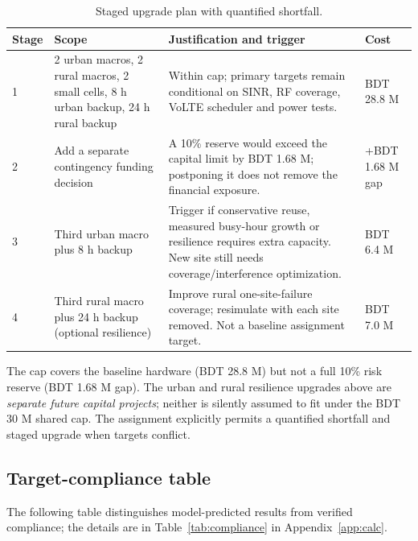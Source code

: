 \documentclass[9pt,a4paper]{extarticle}
\begin{document}
\begin{table}[H]\centering\small
\caption{Staged upgrade plan with quantified shortfall.}
\label{tab:stages}
\begin{tabularx}{\textwidth}{@{}p{0.75cm}p{4.7cm}Xp{1.85cm}@{}}
\toprule
\textbf{Stage} & \textbf{Scope} & \textbf{Justification and trigger} & \textbf{Cost} \\
\midrule
1 & 2 urban macros, 2 rural macros, 2 small cells, 8 h urban backup, 24 h rural backup & Within cap; primary targets remain conditional on SINR, RF coverage, VoLTE scheduler and power tests. & BDT 28.8 M \\
2 & Add a separate contingency funding decision & A 10\% reserve would exceed the capital limit by BDT 1.68 M; postponing it does not remove the financial exposure. & +BDT 1.68 M gap \\
3 & Third urban macro plus 8 h backup & Trigger if conservative reuse, measured busy-hour growth or resilience requires extra capacity. New site still needs coverage/interference optimization. & BDT 6.4 M \\
4 & Third rural macro plus 24 h backup (optional resilience) & Improve rural one-site-failure coverage; resimulate with each site removed. Not a baseline assignment target. & BDT 7.0 M \\
\bottomrule
\end{tabularx}
\end{table}

The cap covers the baseline hardware (BDT 28.8 M) but not a full 10\% risk
reserve (BDT 1.68 M gap). The urban and rural resilience upgrades above are
\emph{separate future capital projects}; neither is silently assumed to fit
under the BDT 30 M shared cap. The assignment explicitly permits a quantified
shortfall and staged upgrade when targets conflict.

\subsection{Target-compliance table}
The following table distinguishes model-predicted results from verified compliance; the details are in
Table~\ref{tab:compliance} in Appendix~\ref{app:calc}.
\end{document}
